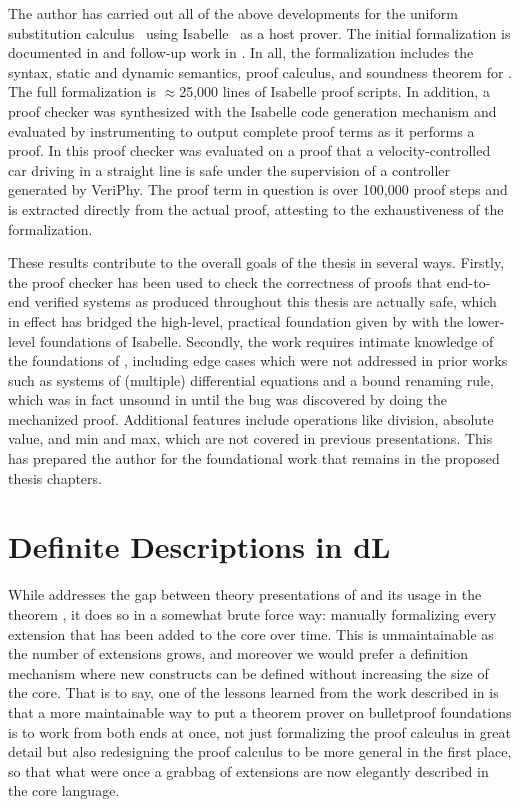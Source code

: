 \documentclass[12pt]{cmuthesis}
\theoremstyle{definition}
\theoremstyle{remark}
\newcommand{\rref}[2][]{\prettyref{#2}}
\newcommand{\VeriPhy}{VeriPhy\xspace}
\begin{document}
The author has carried out all of the above developments for the \dL uniform substitution calculus~\cite{DBLP:journals/jar/Platzer17} using Isabelle~\cite{ISABELLE} as a host prover.
The initial formalization is documented in \cite{DBLP:conf/cpp/BohrerRVVP17} and follow-up work in \cite{DBLP:conf/pldi/BohrerTMMP18}.
In all, the formalization includes the syntax, static and dynamic semantics, proof calculus, and soundness theorem for \dL.
The full formalization is $\approx$25,000 lines of Isabelle proof scripts.
In addition, a proof checker was synthesized with the Isabelle code generation mechanism and evaluated by instrumenting \KeYmaeraX to output complete proof terms as it performs a proof.
In \cite{DBLP:conf/pldi/BohrerTMMP18} this proof checker was evaluated on a proof that a velocity-controlled car driving in a straight line is safe under the supervision of a controller generated by \VeriPhy.
The proof term in question is over 100,000 proof steps and is extracted directly from the actual \KeYmaeraX proof, attesting to the exhaustiveness of the formalization.

These results contribute to the overall goals of the thesis in several ways.
Firstly, the proof checker has been used to check the correctness of \dL proofs that end-to-end verified systems as produced throughout this thesis are actually safe, which in effect has bridged the high-level, practical foundation given by \dL with the lower-level foundations of Isabelle.
Secondly, the work requires intimate knowledge of the foundations of \dL, including edge cases which were not addressed in prior works such as systems of (multiple) differential equations and a bound renaming rule, which was in fact unsound in \KeYmaeraX until the bug was discovered by doing the mechanized proof.
Additional features include operations like division, absolute value, and min and max, which are not covered in previous presentations.
This has prepared the author for the foundational work that remains in the proposed thesis chapters.

\section{Definite Descriptions in dL}
\label{sec:definite-description}
While \rref{sec:isabelle-fml} addresses the gap between theory presentations of \dL and its usage in the theorem \KeYmaeraX, it does so in a somewhat brute force way: manually formalizing every extension that has been added to the \KeYmaeraX core over time.
This is unmaintainable as the number of extensions grows, and moreover we would prefer a definition mechanism where new constructs can be defined without increasing the size of the core.
That is to say, one of the lessons learned from the work described in \rref{sec:isabelle-fml} is that a more maintainable way to put a theorem prover on bulletproof foundations is to work from both ends at once, not just formalizing the proof calculus in great detail but also redesigning the proof calculus to be more general in the first place, so that what were once a grabbag of extensions are now elegantly described in the core language.
\end{document}
